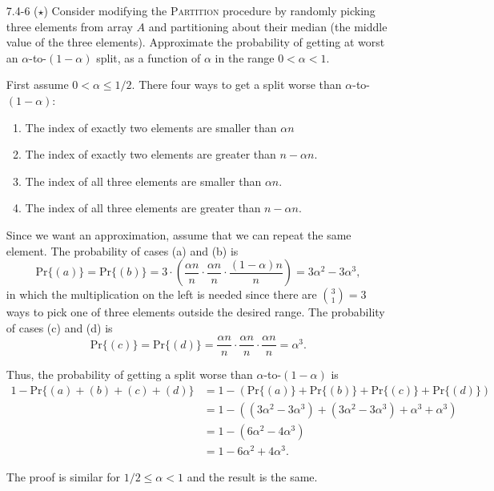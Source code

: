 \documentclass{report}
\makeatletter
\renewenvironment{framed}{%
 \def\FrameCommand##1{\hskip\@totalleftmargin
 \fboxsep=\FrameSep\fbox{##1}}%
 \MakeFramed {\advance\hsize-\width
   \@totalleftmargin\z@ \linewidth\hsize
   \@setminipage}}%
 {\par\unskip\endMakeFramed}
\makeatother
\begin{document}
\begin{enumerate}
\newpage

\item[7.4{-}6]{($\star$) Consider modifying the \textsc{Partition} procedure by
randomly picking three elements from array $A$ and partitioning about their
median (the middle value of the three elements). Approximate the probability of
getting at worst an $\alpha$-to-$(1 - \alpha)$ split, as a function of
$\alpha$ in the range $0 < \alpha < 1$.}

\begin{framed}
First assume $0 < \alpha \le 1/2$. There four ways to get a split worse than
$\alpha$-to-$(1 - \alpha)$:
\begin{enumerate}
  \item The index of exactly two elements are smaller than $\alpha n$
  \item The index of exactly two elements are greater than $n - \alpha n$.
  \item The index of all three elements are smaller than $\alpha n$.
  \item The index of all three elements are greater than $n - \alpha n$.
\end{enumerate}
Since we want an approximation, assume that we can repeat the same element. The
probability of cases (a) and (b) is
\[
  \text{Pr}\{(a)\} = \text{Pr}\{(b)\} =
  3 \cdot \left(\frac{\alpha n}{n} \cdot \frac{\alpha n}{n} \cdot
                \frac{(1 - \alpha) n}{n}\right) =
  3 \alpha^2 - 3 \alpha^3,
\]
in which the multiplication on the left is needed since there are
$\binom{3}{1} = 3$ ways to pick one of three elements outside the desired range.
The probability of cases (c) and (d) is
\[
  \text{Pr}\{(c)\} = \text{Pr}\{(d)\} =
  \frac{\alpha n}{n} \cdot \frac{\alpha n}{n} \cdot \frac{\alpha n}{n} =
  \alpha^3.
\]

Thus, the probability of getting a split worse than $\alpha$-to-$(1 - \alpha)$ is
\begin{equation*}
\begin{aligned}
  1 - \text{Pr}\{(a) + (b) + (c) + (d)\}
  &= 1 - \left(\text{Pr}\{(a)\} + \text{Pr}\{(b)\} + \text{Pr}\{(c)\} + \text{Pr}\{(d)\}\right)\\
  &= 1 - \left((3 \alpha^2 - 3 \alpha^3) + (3 \alpha^2 - 3 \alpha^3) + \alpha^3 + \alpha^3\right)\\
  &= 1 - (6 \alpha^2 - 4 \alpha^3)\\
  &= 1 - 6 \alpha^2 + 4 \alpha^3.
\end{aligned}
\end{equation*}

The proof is similar for $1/2 \le \alpha < 1$ and the result is the same.
\end{framed}

\end{enumerate}
\end{document}

